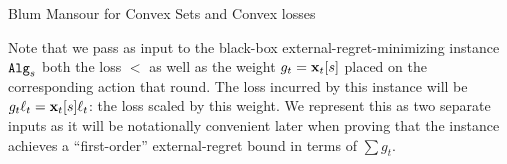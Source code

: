 \begin{algorithm}
\caption{Blum Mansour for Convex Sets and Convex losses}
\label{alg:BMCS}




\end{algorithm}






























Note that we pass as input to the black-box external-regret-minimizing instance $\mathtt{Alg}_s$ both the loss $\lt$ as well as the weight $g_t = \mathbf{x}_t[s]$ placed on the corresponding action that round.  The loss incurred by this instance will be $g_t\ell_t=\mathbf{x}_t[s]\ell_t$: the loss scaled by this weight.  We represent this as two separate inputs as it will be notationally convenient later when proving that the instance achieves a ``first-order'' external-regret bound in terms of $\sum g_t$.

